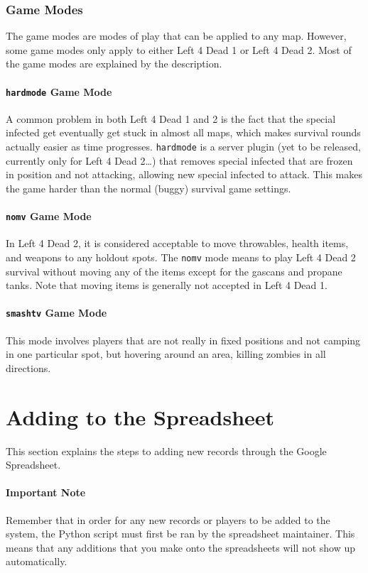 \subsubsection{Game Modes}
The game modes are modes of play that can be applied to any map. However, some game modes only apply to either Left 4 Dead 1 or Left 4 Dead 2. Most of the game modes are explained by the description.

\paragraph{\texttt{hardmode} Game Mode}
A common problem in both Left 4 Dead 1 and 2 is the fact that the special infected get eventually get stuck in almost all maps, which makes survival rounds actually easier as time progresses. \texttt{hardmode} is a server plugin (yet to be released, currently only for Left 4 Dead 2\ldots) that removes special infected that are frozen in position and not attacking, allowing new special infected to attack. This makes the game harder than the normal (buggy) survival game settings.

\paragraph{\texttt{nomv} Game Mode}
In Left 4 Dead 2, it is considered acceptable to move throwables, health items, and weapons to any holdout spots. The \texttt{nomv} mode means to play Left 4 Dead 2 survival without moving any of the items except for the gascans and propane tanks. Note that moving items is generally not accepted in Left 4 Dead 1.

\paragraph{\texttt{smashtv} Game Mode}
This mode involves players that are not really in fixed positions and not camping in one particular spot, but hovering around an area, killing zombies in all directions.

\section{Adding to the Spreadsheet} \label{sec:adding}
This section explains the steps to adding new records through the Google Spreadsheet.
\paragraph{Important Note}
Remember that in order for any new records or players to be added to the system, the Python script must first be ran by the spreadsheet maintainer. This means that any additions that you make onto the spreadsheets will not show up automatically.


